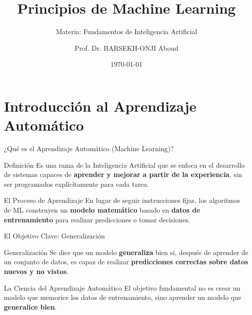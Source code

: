 \documentclass[aspectratio=169,xcolor=dvipsnames]{beamer}
\title{Principios de Machine Learning}
\subtitle{Materia: Fundamentos de Inteligencia Artificial}
\author{Prof. Dr. BARSEKH-ONJI Aboud}
\institute
{
    Facultad de Ingeniería \\
    Universidad Anáhuac México %
}
\date{\today} %
\begin{document}
\begin{frame}
    \titlepage
\end{frame}

\section{Introducción al Aprendizaje Automático}

\begin{frame}{¿Qué es el Aprendizaje Automático (Machine Learning)?}
    \begin{block}{Definición}
    Es una rama de la Inteligencia Artificial que se enfoca en el desarrollo de sistemas capaces de \textbf{aprender y mejorar a partir de la experiencia}, sin ser programados explícitamente para cada tarea.
    \end{block}
    
    \begin{alertblock}{El Proceso de Aprendizaje}
    En lugar de seguir instrucciones fijas, los algoritmos de ML construyen un \textbf{modelo matemático} basado en \textbf{datos de entrenamiento} para realizar predicciones o tomar decisiones.
    \end{alertblock}
\end{frame}


\begin{frame}{El Objetivo Clave: Generalización}
    \begin{block}{Generalización}
    Se dice que un modelo \textbf{generaliza} bien si, después de aprender de un conjunto de datos, es capaz de realizar \textbf{predicciones correctas sobre datos nuevos y no vistos}.
    \end{block}
    
    \begin{alertblock}{La Ciencia del Aprendizaje Automático}
    El objetivo fundamental no es crear un modelo que memorice los datos de entrenamiento, sino aprender un modelo que \textbf{generalice bien}.
    \end{alertblock}
\end{frame}

\end{document}
